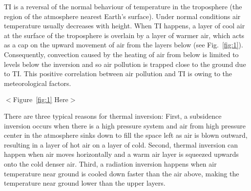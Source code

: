 \documentclass[12pt]{article}
\begin{document}
TI is a reversal of the normal behaviour of temperature in the troposphere (the region of the atmosphere nearest Earth's surface). Under normal conditions air temperature usually decreases with height. When TI happens, a layer of cool air at the surface of the troposphere is overlain by a layer of warmer air, which acts as a cap on the upward movement of air from the layers below (see
Fig.~\ref{fig:1}). Consequently, convection caused by the heating of air from below is limited to levels below the inversion and so air pollution is trapped close to the ground due to TI. This positive correlation between air pollution and TI is owing to the meteorological factors. 

\begin{center}
  $<$Figure~\ref{fig:1} Here$>$
  \end{center}

There are three typical reasons for
thermal inversion: First, a subsidence inversion occurs when there is
a high pressure system and air from high pressure center in the atmosphere
sinks down to fill the space left as air is blown outward, resulting in a layer
of hot air on a layer of cold. Second, thermal inversion can happen when air
moves horizontally and a warm air layer is squeezed upwards onto the cold
denser air. Third, a radiation inversion happens when air temperature
near ground is cooled down faster than the air above, making the temperature near ground lower than the upper layers.
\end{document}
